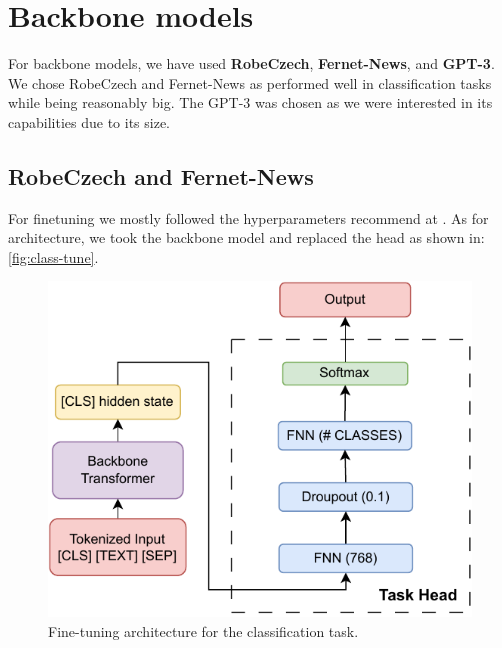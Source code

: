 \section{Backbone models}
\label{sec:backbone}
For backbone models, we have used \textbf{RobeCzech}, \textbf{Fernet-News}, and \textbf{GPT-3}.
We chose RobeCzech and Fernet-News as performed well in classification tasks while being reasonably big.
The GPT-3 was chosen as we were interested in its capabilities due to its size.

\subsection{RobeCzech and Fernet-News}
\label{sec:robe-czech}
For finetuning we mostly followed the hyperparameters
recommend at \cite{sunHowFineTuneBERT2020}.
As for architecture, we took the backbone model and replaced the head as shown in: \autoref{fig:class-tune}.

\begin{figure}[h]
    \centering
    \includegraphics[width=0.7\linewidth]{img/transformer/fine_tune.pdf}
    \caption{Fine-tuning architecture for the classification task.}
    \label{fig:class-tune}
\end{figure}

